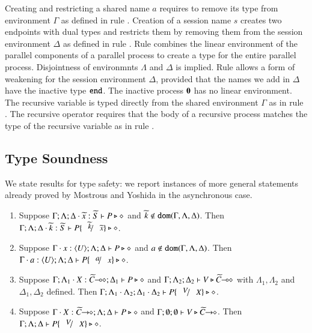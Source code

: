 Creating and restricting a
 shared name $a$ requires to remove
its type from environment $\Gamma$ as defined in 
rule . 
Creation of a session name $s$
creates two endpoints with dual types and restricts
them by removing them from the session environment
$\Delta$ as defined in rule . Rule
 combines the linear environment of
the parallel components of a parallel process
to create a type for the entire parallel process.
Disjointness of environmnts $\Lambda$ and $\Delta$
is implied. Rule  allows a form of weakening 
for the session environment $\Delta$, provided that
the names we add in $\Delta$ have the inactive
type $\mathtt{end}$. The inactive process $\mathbf{0}$ has no
linear environment. The recursive variable is typed
directly from the shared environment $\Gamma$ as
in rule .
The recursive operator requires that the body of
a recursive process matches the type of the recursive
variable as in rule . 



\subsection{Type Soundness}
We state results for type safety:
we report instances of more general statements already proved by
Mostrous and Yoshida in the asynchronous case.

\begin{lemma}\rm
	\label{lem:subst}
	\begin{enumerate}[1.]
		\item	Suppose $\Gamma; \Lambda; \Delta \cdot \widetilde{x}:\widetilde{S}  \vdash P \triangleright \diamond$ and
			$\widetilde{k} \not\in \mathtt{dom}(\Gamma, \Lambda, \Delta)$. 
			Then $\Gamma; \Lambda; \Delta \cat \widetilde{k}:\widetilde{S}  \vdash P\subst{\widetilde{k}}{\widetilde{x}} \hastype \Proc$.

		\item	Suppose $\Gamma \cdot x:\langle U \rangle; \Lambda; \Delta \vdash P \triangleright \diamond$ and
			$a \notin \mathtt{dom}(\Gamma, \Lambda, \Delta)$. 
			Then $\Gamma \cat a:\chtype{U}; \Lambda; \Delta   \vdash P\subst{a}{x} \hastype \Proc$.

		\item	Suppose $\Gamma; \Lambda_1 \cdot X:\widetilde{C}\!\! \multimap\!\! \diamond; \Delta_1  \vdash P \triangleright \diamond$ 
			and $\Gamma; \Lambda_2; \Delta_2  \vdash V \triangleright \widetilde{C}\!\! \multimap\!\! \diamond$ with 
			$\Lambda_1, \Lambda_2$ and $\Delta_1, \Delta_2$ defined.  
			Then $\Gamma; \Lambda_1 \cat \Lambda_2; \Delta_1 \cat \Delta_2  \proves P\subst{V}{X} \hastype \Proc$.

		\item	Suppose $\Gamma \cdot X:\widetilde{C}\!\! \rightarrow\!\! \diamond; \Lambda; \Delta  \vdash P \triangleright \diamond$ and
			$\Gamma; \emptyset ; \emptyset  \vdash V \triangleright \widetilde{C}\!\! \rightarrow\!\! \diamond$.
			Then $\Gamma; \Lambda; \Delta  \proves P\subst{V}{X} \hastype \Proc$.
		\end{enumerate}
\end{lemma}

